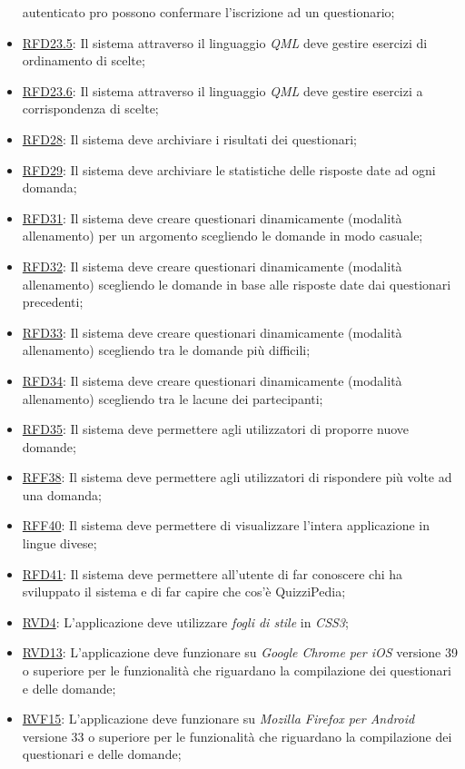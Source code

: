 \begin{itemize}
autenticato pro possono confermare
l’iscrizione ad un questionario;
\item \hyperlink{RFD23.5}{RFD23.5}: Il sistema attraverso il linguaggio \textit{QML} deve gestire esercizi di ordinamento di
scelte;
\item \hyperlink{RFD23.6}{RFD23.6}: Il sistema attraverso il linguaggio \textit{QML} deve gestire esercizi a corrispondenza di
scelte;
\item \hyperlink{RFD28}{RFD28}: Il sistema deve archiviare i risultati dei
questionari;
\item \hyperlink{RFD29}{RFD29}: Il sistema deve archiviare le statistiche
delle risposte date ad ogni domanda;
\item \hyperlink{RFD31}{RFD31}: Il sistema deve creare questionari
dinamicamente (modalità allenamento)
per un argomento scegliendo le domande
in modo casuale;
\item \hyperlink{RFD32}{RFD32}: Il sistema deve creare questionari
dinamicamente (modalità allenamento)
scegliendo le domande in base alle
risposte date dai questionari precedenti;
\item \hyperlink{RFD33}{RFD33}: Il sistema deve creare questionari
dinamicamente (modalità allenamento)
scegliendo tra le domande più difficili;
\item \hyperlink{RFD34}{RFD34}: Il sistema deve creare questionari
dinamicamente (modalità allenamento)
scegliendo tra le lacune dei partecipanti;
\item \hyperlink{RFD35}{RFD35}: Il sistema deve permettere agli
utilizzatori di proporre nuove domande;
\item \hyperlink{RFF38}{RFF38}: Il sistema deve permettere agli
utilizzatori di rispondere più volte ad una
domanda;
\item \hyperlink{RFF40}{RFF40}: Il sistema deve permettere di visualizzare l'intera applicazione in lingue divese;
\item \hyperlink{RFD41}{RFD41}: Il sistema deve permettere all'utente di far conoscere chi ha sviluppato il sistema e di far capire che cos'è QuizziPedia;
\item \hyperlink{RVD4}{RVD4}: L’applicazione deve utilizzare \textit{fogli di stile} in \textit{CSS3};
\item \hyperlink{RVD13}{RVD13}: L’applicazione deve funzionare su \textit{Google Chrome per iOS} versione 39 o superiore per le funzionalità che riguardano la compilazione dei questionari e delle domande;
\item \hyperlink{RVF15}{RVF15}: L’applicazione deve funzionare su \textit{Mozilla Firefox per Android} versione 33 o superiore per le funzionalità che riguardano la compilazione dei questionari e delle domande;

\end{itemize}
